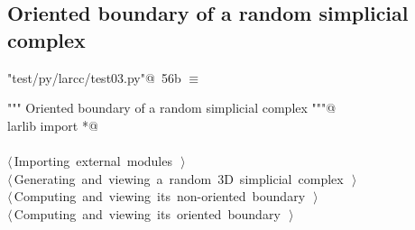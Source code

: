 \documentclass[11pt,oneside]{article}	%
\begin{document}
\subsection{Oriented boundary of a random simplicial complex}


\begin{flushleft} \small
\begin{minipage}{\linewidth} \label{scrap100}
\protect{}\verb@"test/py/larcc/test03.py"@\nobreak\ {\footnotesize 56b }$\equiv$
\vspace{-1ex}
\begin{list}{}{} \item
\mbox{}\verb@""" Oriented boundary of a random simplicial complex """@\\
\mbox{}\verb@from larlib import *@\\
\mbox{}\verb@@\\
\mbox{}\verb@@\hbox{$\langle\,$Importing external modules\nobreak\ {\footnotesize {}}$\,\rangle$}\verb@@\\
\mbox{}\verb@@\hbox{$\langle\,$Generating and viewing a random 3D simplicial complex\nobreak\ {\footnotesize {}}$\,\rangle$}\verb@@\\
\mbox{}\verb@@\hbox{$\langle\,$Computing and viewing its non-oriented boundary\nobreak\ {\footnotesize {}}$\,\rangle$}\verb@@\\
\mbox{}\verb@@\hbox{$\langle\,$Computing and viewing its oriented boundary\nobreak\ {\footnotesize {}}$\,\rangle$}\verb@@\\
\mbox{}\verb@@{\NWsep}
\end{list}
\vspace{-2ex}
\end{minipage}\\[4ex]
\end{flushleft}
\end{document}
